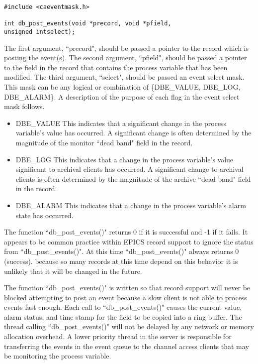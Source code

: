 \begin{verbatim}#include <caeventmask.h>

int db_post_events(void *precord, void *pfield,
unsigned intselect);
\end{verbatim}The first argument, ``precord", should be passed a pointer to the record which is posting the event(s). The second 
argument, ``pfield", should be passed a pointer to the field in the record that contains the process variable that has been 
modified. The third argument, ``select", should be passed an event select mask. This mask can be any logical or 
combination of \{DBE\_VALUE, DBE\_LOG, DBE\_ALARM\}. A description of the purpose of each flag in the event select 
mask follows.

\begin{itemize}\item DBE\_VALUE This indicates that a significant change in the process variable's value has occurred. A significant 
change is often determined by the magnitude of the monitor ``dead band" field in the record.

\item DBE\_LOG This indicates that a change in the process variable's value significant to archival clients has occurred. 
A significant change to archival clients is often determined by the magnitude of the archive ``dead band" field in 
the record.

\item DBE\_ALARM This indicates that a change in the process variable's alarm state has occurred.

\end{itemize}The function ``db\_post\_events()" returns 0 if it is successful and -1 if it fails. It appears to be common practice within 
EPICS record support to ignore the status from ``db\_post\_events()". At this time ``db\_post\_events()" always returns 0 
(success). because so many records at this time depend on this behavior it is unlikely that it will be changed in the future.

The function ``db\_post\_events()" is written so that record support will never be blocked attempting to post an event 
because a slow client is not able to process events fast enough. Each call to ``db\_post\_events()" causes the current value, 
alarm status, and time stamp for the field to be copied into a ring buffer. The thread calling ``db\_post\_events()" will not be 
delayed by any network or memory allocation overhead. A lower priority thread in the server is responsible for 
transferring the events in the event queue to the channel access clients that may be monitoring the process variable.

